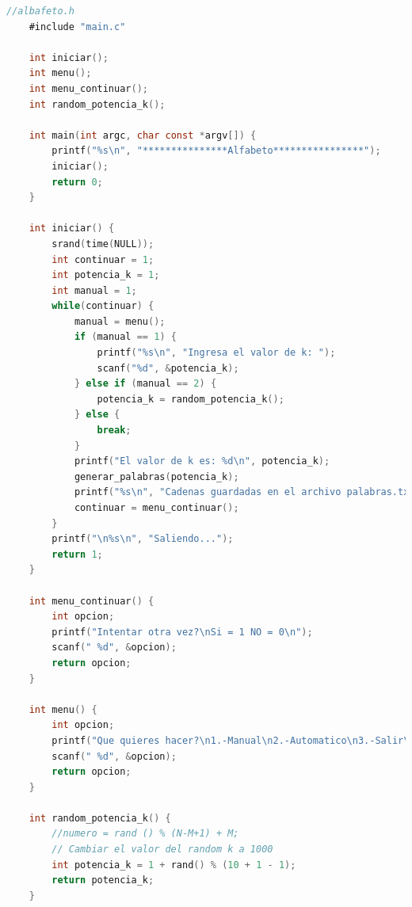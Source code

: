 \documentclass[12pt, titlepage]{article}
\begin{document}
	\begin{lstlisting}[language=C]
	//albafeto.h
	#include "main.c"
	
	int iniciar();
	int menu();
	int menu_continuar();
	int random_potencia_k();
	
	int main(int argc, char const *argv[]) {
		printf("%s\n", "***************Alfabeto****************");
		iniciar();
		return 0;
	}
	
	int iniciar() {
		srand(time(NULL));
		int continuar = 1;
		int potencia_k = 1;
		int manual = 1;
		while(continuar) {
			manual = menu();
			if (manual == 1) {
				printf("%s\n", "Ingresa el valor de k: ");
				scanf("%d", &potencia_k);
			} else if (manual == 2) {
				potencia_k = random_potencia_k();
			} else {
				break;
			}
			printf("El valor de k es: %d\n", potencia_k);
			generar_palabras(potencia_k);
			printf("%s\n", "Cadenas guardadas en el archivo palabras.txt");
			continuar = menu_continuar();
		}
		printf("\n%s\n", "Saliendo...");
		return 1;
	}
	
	int menu_continuar() {
		int opcion;
		printf("Intentar otra vez?\nSi = 1 NO = 0\n");
		scanf(" %d", &opcion);
		return opcion;
	}
	
	int menu() {
		int opcion;
		printf("Que quieres hacer?\n1.-Manual\n2.-Automatico\n3.-Salir\n");
		scanf(" %d", &opcion);
		return opcion;
	}
	
	int random_potencia_k() {
		//numero = rand () % (N-M+1) + M;
		// Cambiar el valor del random k a 1000
		int potencia_k = 1 + rand() % (10 + 1 - 1);
		return potencia_k;
	}
	\end{lstlisting}
\end{document}
